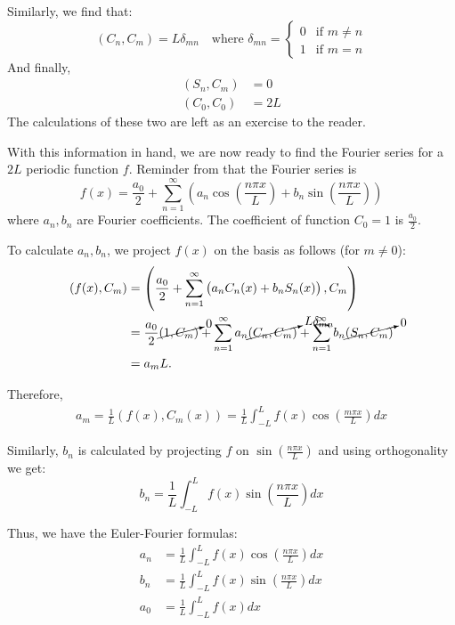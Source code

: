 Similarly, we find that:
\[
(C_n, C_m) = L \delta_{mn} \quad \text{where } \delta_{mn} = \begin{cases}0 & \text{if } m \neq n \\ 1 & \text{if } m = n
\end{cases}
\]
And finally,
\begin{align*}
	(S_n, C_m) &= 0 \\
	(C_0, C_0) &= 2L
\end{align*}
The calculations of these two are left as an exercise to the reader.

With this information in hand, we are now ready to find the Fourier series for a $2L$ periodic function $f$. Reminder from  that the Fourier series is
\[
f(x) = \frac{a_0}{2} + \sum_{n=1}^{\infty} \left(a_n \cos{\left(\frac{n\pi x}{L}\right)} + b_n \sin{\left(\frac{n\pi x}{L}\right)}\right)
\]
where $a_n, b_n$ are Fourier coefficients. The coefficient of function $C_0 = 1$ is $\frac{a_0}{2}$.

To calculate $a_n, b_n$, we project $f(x)$ on the basis as follows (for $m \neq 0$): 
\begin{align*}
	(f(x), C_m) & = \left( \frac{a_0}{2} + \sum_{n=1}^{\infty} \left(a_n C_n(x) + b_n S_n(x) \right), C_m \right) \\
	& = \frac{a_0}{2}\cancelto{0}{(1,C_m)} + \sum_{n=1}^{\infty} a_n\cancelto{L\delta_{mn}}{(C_n, C_m)} + \sum_{n=1}^{\infty} b_n\cancelto{0}{(S_n, C_m)} \\
	&= a_m L.
\end{align*}

Therefore,
\begin{align*}
	a_m = \frac{1}{L} (f(x), C_m(x)) = \frac{1}{L} \int_{-L}^L f(x) \cos{\left(\frac{m \pi x}{L}\right)} dx
\end{align*}

Similarly, $b_n$ is calculated by projecting $f$ on $\sin{\left( \frac{n \pi x}{L} \right)}$ and using orthogonality we get:
\[
b_n = \frac{1}{L} \int_{-L}^L f(x) \sin{\left( \frac{n \pi x}{L} \right)} dx
\]

Thus, we have the Euler-Fourier formulas:
\begin{align}
	\label{eq:eulerfourier1}
	a_n &= \frac{1}{L} \int_{-L}^L f(x) \cos{\left( \frac{n \pi x}{L} \right)} dx \\
	\label{eq:eulerfourier2}
	b_n &= \frac{1}{L} \int_{-L}^L f(x) \sin{\left( \frac{n \pi x}{L} \right)} dx \\
	\label{eq:eulerfourier3}
	a_0 &= \frac{1}{L} \int_{-L}^L f(x) dx
\end{align}

